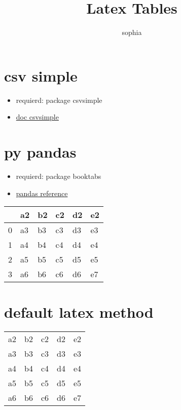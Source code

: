 \documentclass[10pt]{article}
\title{Latex Tables}
\date{}
\author{sophia}
\begin{document}
 
\maketitle
\tableofcontents
 
\section{csv simple}
\begin{itemize}
    \item requierd: package csvsimple
    \item \href{https://mirror.dogado.de/tex-archive/macros/latex/contrib/csvsimple/csvsimple.pdf}{doc csvsimple}
\end{itemize}

\section{py pandas}
\begin{itemize}
    \item requierd: package booktabs
    \item \href{https://pandas.pydata.org/pandas-docs/stable/reference/api/pandas.DataFrame.to_latex.html}{pandas reference}
\end{itemize}
\begin{tabular}{llllll}
    \toprule
    {} &  a2 &  b2 &  c2 &  d2 &  e2 \\
    \midrule
    0 &  a3 &  b3 &  c3 &  d3 &  e3 \\
    1 &  a4 &  b4 &  c4 &  d4 &  e4 \\
    2 &  a5 &  b5 &  c5 &  d5 &  e5 \\
    3 &  a6 &  b6 &  c6 &  d6 &  e7 \\
    \bottomrule
    \end{tabular}

\section{default latex method}
\begin{center}
    \begin{tabular}{ c c c c c }
    a2 & b2 & c2 & d2 & e2 \\ 
    a3 & b3 & c3 & d3 & e3 \\ 
    a4 & b4 & c4 & d4 & e4 \\ 
    a5 & b5 & c5 & d5 & e5 \\ 
    a6 & b6 & c6 & d6 & e7 \\ 
    \end{tabular} 
\end{center}
\end{document}

